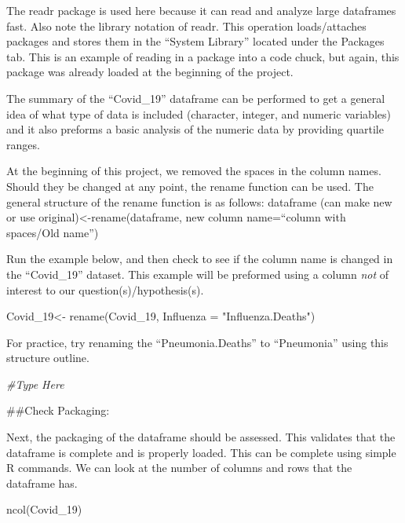 \documentclass[
]{article}
\newenvironment{Shaded}{\begin{snugshade}}{\end{snugshade}}
\newcommand{\AttributeTok}[1]{\textcolor[rgb]{0.77,0.63,0.00}{#1}}
\newcommand{\CommentTok}[1]{\textcolor[rgb]{0.56,0.35,0.01}{\textit{#1}}}
\newcommand{\FunctionTok}[1]{\textcolor[rgb]{0.00,0.00,0.00}{#1}}
\newcommand{\NormalTok}[1]{#1}
\newcommand{\OtherTok}[1]{\textcolor[rgb]{0.56,0.35,0.01}{#1}}
\newcommand{\StringTok}[1]{\textcolor[rgb]{0.31,0.60,0.02}{#1}}
\begin{document}
The readr package is used here because it can read and analyze large
dataframes fast. Also note the library notation of readr. This operation
loads/attaches packages and stores them in the ``System Library''
located under the Packages tab. This is an example of reading in a
package into a code chuck, but again, this package was already loaded at
the beginning of the project.

The summary of the ``Covid\_19'' dataframe can be performed to get a
general idea of what type of data is included (character, integer, and
numeric variables) and it also preforms a basic analysis of the numeric
data by providing quartile ranges.

At the beginning of this project, we removed the spaces in the column
names. Should they be changed at any point, the rename function can be
used. The general structure of the rename function is as follows:
dataframe (can make new or use original)\textless-rename(dataframe, new
column name=``column with spaces/Old name'')

Run the example below, and then check to see if the column name is
changed in the ``Covid\_19'' dataset. This example will be preformed
using a column \emph{not} of interest to our question(s)/hypothesis(s).

\begin{Shaded}
\begin{Highlighting}[]
\NormalTok{Covid\_19}\OtherTok{\textless{}{-}} \FunctionTok{rename}\NormalTok{(Covid\_19, }\AttributeTok{Influenza =} \StringTok{"Influenza.Deaths"}\NormalTok{)}
\end{Highlighting}
\end{Shaded}

For practice, try renaming the ``Pneumonia.Deaths'' to ``Pneumonia''
using this structure outline.

\begin{Shaded}
\begin{Highlighting}[]
\CommentTok{\#Type Here}
\end{Highlighting}
\end{Shaded}

\#\#Check Packaging:

Next, the packaging of the dataframe should be assessed. This validates
that the dataframe is complete and is properly loaded. This can be
complete using simple R commands. We can look at the number of columns
and rows that the dataframe has.

\begin{Shaded}
\begin{Highlighting}[]
\FunctionTok{ncol}\NormalTok{(Covid\_19)}
\end{Highlighting}
\end{Shaded}
\end{document}
